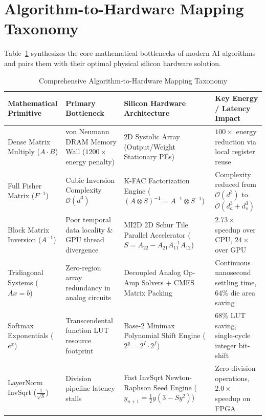 \section{Algorithm-to-Hardware Mapping Taxonomy}
Table~\ref{tab:ch12_mapping_taxonomy} synthesizes the core mathematical bottlenecks of modern AI algorithms and pairs them with their optimal physical silicon hardware solution.

\begin{table}[htbp]
\centering
\caption{Comprehensive Algorithm-to-Hardware Mapping Taxonomy}
\label{tab:ch12_mapping_taxonomy}
\begin{tabularx}{\textwidth}{l X X X}
\toprule
\textbf{Mathematical Primitive} & \textbf{Primary Bottleneck} & \textbf{Silicon Hardware Architecture} & \textbf{Key Energy / Latency Impact} \\
\midrule
Dense Matrix Multiply ($A \cdot B$) & von Neumann DRAM Memory Wall ($1200\times$ energy penalty) & 2D Systolic Array (Output/Weight Stationary PEs) & $100\times$ energy reduction via local register reuse \\
Full Fisher Matrix ($F^{-1}$) & Cubic Inversion Complexity $\mathcal{O}(d^3)$ & K-FAC Factorization Engine ($(A \otimes S)^{-1} = A^{-1} \otimes S^{-1}$) & Complexity reduced from $\mathcal{O}(d^3)$ to $\mathcal{O}(d_a^3 + d_s^3)$ \\
Block Matrix Inversion ($A^{-1}$) & Poor temporal data locality \& GPU thread divergence & MI2D 2D Schur Tile Parallel Accelerator ($S = A_{22} - A_{21}A_{11}^{-1}A_{12}$) & $2.73\times$ speedup over CPU, $24\times$ over GPU \\
Tridiagonal Systems ($A x = b$) & Zero-region array redundancy in analog circuits & Decoupled Analog Op-Amp Solvers + CMES Matrix Packing & Continuous nanosecond settling time, $64\%$ die area saving \\
Softmax Exponentials ($e^x$) & Transcendental function LUT resource footprint & Base-2 Minimax Polynomial Shift Engine ($2^y = 2^I \cdot 2^f$) & $68\%$ LUT saving, single-cycle integer bit-shift \\
LayerNorm InvSqrt ($\frac{1}{\sqrt{S}}$) & Division pipeline latency stalls & Fast InvSqrt Newton-Raphson Seed Engine ($y_{n+1} = \frac{1}{2}y(3-Sy^2)$) & Zero division operations, $2.0\times$ speedup on FPGA \\
\bottomrule
\end{tabularx}
\end{table}


